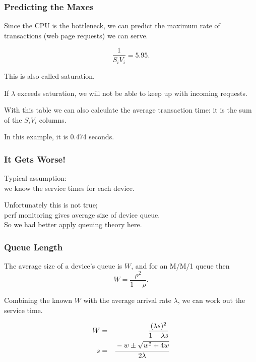 \begin{frame}
\frametitle{Predicting the Maxes}

\begin{changemargin}{1cm}
\large 
Since the CPU is the bottleneck, we can predict the maximum rate of transactions (web page requests) we can serve. 

\[ \dfrac{1}{S_{i}V_{i}} = 5.95. \]

This is also called saturation.

 If $\lambda$ exceeds saturation, we will not be able to keep up with incoming requests.

With this table we can also calculate the average transaction time: it is the sum of the $S_{i}V_{i}$ columns. 

In this example, it is 0.474 seconds. 
\end{changemargin}

\end{frame}



\begin{frame}
\frametitle{It Gets Worse!}

\begin{changemargin}{0.8cm}
\large 
Typical assumption: \\
\qquad we know the service times for each device. 

Unfortunately this is not true;\\
\qquad perf monitoring gives average size of device queue. \\[1em]

So we had better apply queuing theory here.
\end{changemargin}


\end{frame}



\begin{frame}
\frametitle{Queue Length}

\begin{changemargin}{0.8cm}
\large 

The average size of a device's queue is $W$, and for an M/M/1 queue then 
\[ W = \dfrac{\rho^{2}}{1-\rho}.\]

Combining the known $W$ with the average arrival rate $\lambda$, we can work out the service time. 

\begin{eqnarray*}
W &=& \dfrac{(\lambda s)^{2}}{1 - \lambda s}\\
s &=& \cfrac{-w \pm \sqrt{w^{2}+4w}}{2\lambda}\\
\end{eqnarray*}
\end{changemargin}



\end{frame}




